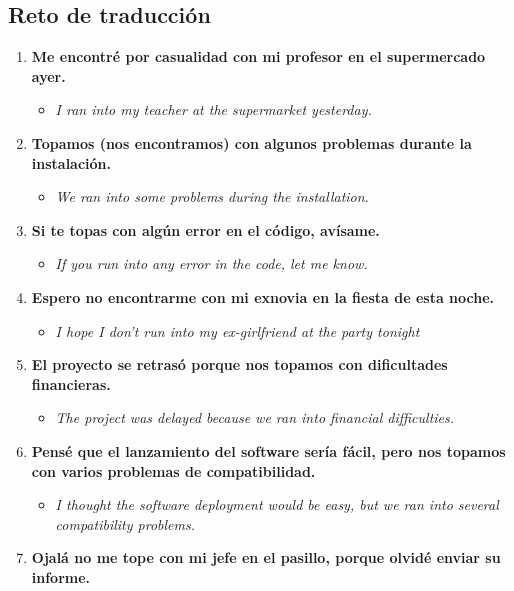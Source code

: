 \documentclass[
10pt, %
a4paper, %
oneside, %
headinclude,footinclude, %
BCOR5mm, %
]{scrartcl}
\begin{document}
\subsection{Reto de traducción}
\begin{enumerate}
	\item \textbf{Me encontré por casualidad con mi profesor en el supermercado ayer.}
	\begin{itemize}
		\item \textit{I ran into my teacher at the supermarket yesterday.}
	\end{itemize}
	\item \textbf{Topamos (nos encontramos) con algunos problemas durante la instalación.}
	\begin{itemize}
		\item \textit{We ran into some problems during the installation.}
	\end{itemize}
	\item \textbf{Si te topas con algún error en el código, avísame.}
	\begin{itemize}
		\item \textit{If you run into any error in the code, let me know.}
	\end{itemize}
	\item \textbf{Espero no encontrarme con mi exnovia en la fiesta de esta noche.}
	\begin{itemize}
		\item \textit{I hope I don't run into my ex-girlfriend at the party tonight}
	\end{itemize}
	\item \textbf{El proyecto se retrasó porque nos topamos con dificultades financieras.}
	\begin{itemize}
		\item \textit{The project was delayed because we ran into financial difficulties.}
	\end{itemize}
	\item \textbf{Pensé que el lanzamiento del software sería fácil, pero nos topamos con varios problemas de compatibilidad.}
	\begin{itemize}
		\item \textit{I thought the software deployment would be easy, but we ran into several compatibility problems.}
	\end{itemize}
	\item \textbf{Ojalá no me tope con mi jefe en el pasillo, porque olvidé enviar su informe.}
	\begin{itemize}

\end{itemize}
\end{enumerate}
\end{document}

